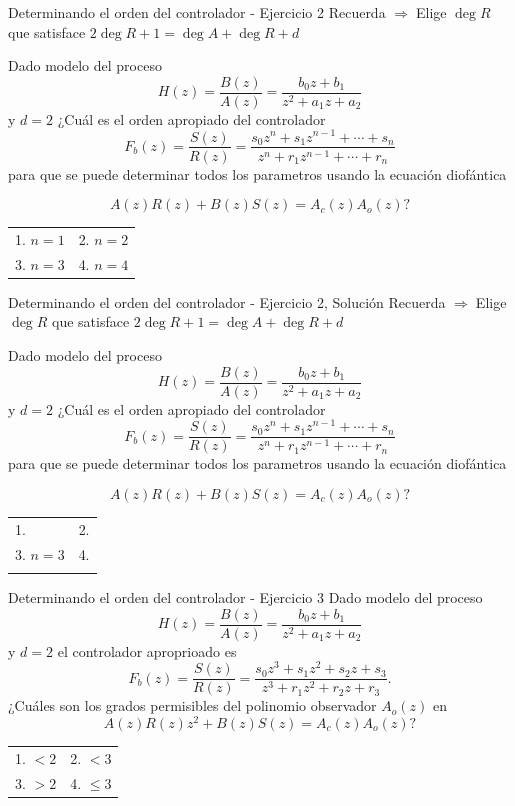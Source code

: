 \documentclass[presentation,aspectratio=169]{beamer}
\begin{document}
\begin{frame}[label={sec:orgdd57c23}]{Determinando el orden del controlador - Ejercicio 2}
Recuerda    \alert{\(\Rightarrow\;\)Elige \(\deg R\) que satisface \(2\deg R + 1 = \deg A + \deg R + d\)}

   Dado modelo del proceso \[H(z) = \frac{B(z)}{A(z)} = \frac{b_0z + b_1}{z^2 + a_1z + a_2}\] y \(d=2\)  ¿Cuál es el orden apropiado del controlador 
\[F_b(z) = \frac{S(z)}{R(z)} = \frac{s_0z^n + s_1z^{n-1} + \cdots + s_n}{z^n + r_1 z^{n-1} + \cdots + r_n}\]
para que se puede determinar todos los parametros usando la ecuación diofántica

\[ A(z)R(z) + B(z)S(z) = A_c(z)A_o(z)?\]

\begin{center}
\begin{tabular}{ll}
1. \(n = 1\) & 2. \(n = 2\)\\
3. \(n=3\) & 4. \(n=4\)\\
\end{tabular}
\end{center}
\end{frame}

\begin{frame}[label={sec:org2e62d0b}]{Determinando el orden del controlador - Ejercicio 2, Solución}
Recuerda    \alert{\(\Rightarrow\;\)Elige \(\deg R\) que satisface \(2\deg R + 1 = \deg A + \deg R + d\)}

   Dado modelo del proceso \[H(z) = \frac{B(z)}{A(z)} = \frac{b_0z + b_1}{z^2 + a_1z + a_2}\] y \(d=2\)  ¿Cuál es el orden apropiado del controlador 
\[F_b(z) = \frac{S(z)}{R(z)} = \frac{s_0z^n + s_1z^{n-1} + \cdots + s_n}{z^n + r_1 z^{n-1} + \cdots + r_n}\]
para que se puede determinar todos los parametros usando la ecuación diofántica

\[ A(z)R(z) + B(z)S(z) = A_c(z)A_o(z)?\]

\begin{center}
\begin{tabular}{lr}
1. & 2.\\
3. \(n=3\) & 4.\\
 & \\
\end{tabular}
\end{center}
\end{frame}


\begin{frame}[label={sec:orgd92d47d}]{Determinando el orden del controlador - Ejercicio 3}
   Dado modelo del proceso \[H(z) = \frac{B(z)}{A(z)} = \frac{b_0z + b_1}{z^2 + a_1z + a_2}\] y \(d=2\)   el controlador aproprioado es 
\[F_b(z) = \frac{S(z)}{R(z)} = \frac{s_0z^3 + s_1z^2 + s_2z + s_3}{z^3 + r_1 z^2 + r_2z + r_3}.\]
¿Cuáles son los grados permisibles del polinomio observador \(A_o(z)\) en
   \[ A(z)R(z)z^2 + B(z)S(z) = A_c(z)A_o(z)?\]

\begin{center}
\begin{tabular}{ll}
1. \(< 2\) & 2. \(< 3\)\\
3. \(> 2\) & 4. \(\le 3\)\\
\end{tabular}
\end{center}
\end{frame}
\end{document}
